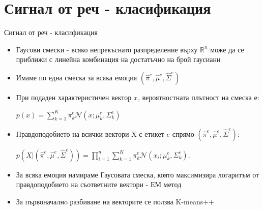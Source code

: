 \documentclass[9pt]{beamer}
\begin{document}
    \section{Сигнал от реч - класификация}
    \begin{frame}[t]{Сигнал от реч - класификация}
        \begin{itemize}
            \item Гаусови смески
            \pause - всяко непрекъснато разпределение върху $\mathbb{R}^{n}$ може да се приближи с линейна комбинация на достатъчно на брой гаусиани
            \pause
            \item Имаме по една смеска за всяка емоция $(\hat{\pi}^e, \hat{\mu}^e, \hat{\Sigma}^e)$
            \pause
            \item При подаден характеристичен вектор $x$, вероятностната плътност на смеска е:
            \pause

            $p(x) = \sum\limits_{k=1}^{K} \pi_k^e \mathcal{N}(x; \mu_k^e, \Sigma_k^e)$
            \pause
            \item Правдоподобието на всички вектори X с етикет $e$ спрямо $(\hat{\pi}^e, \hat{\mu}^e, \hat{\Sigma}^e)$:
            \pause    
        
            $p(X|(\hat{\pi}^e, \hat{\mu}^e, \hat{\Sigma}^e)) = \prod\limits_{i=1}^{n} \sum\limits_{k=1}^{K} \pi_k^e \mathcal{N}(x_i; \mu_k^e, \Sigma_k^e)$.
            \pause
            \item За всяка емоция намираме Гаусовата смеска, която максимизира логаритъм от правдоподобието на съответните вектори
            \pause - ЕМ метод
            \pause
            \item За първоначалнo разбиване на векторите се ползва K-means++
        \end{itemize}
    \end{frame}
\end{document}
